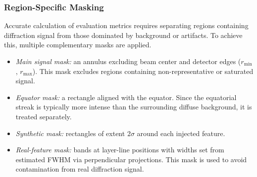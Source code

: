 \documentclass[iucr]{iucrjournals}
\begin{document}
\subsubsection{Region-Specific Masking}

Accurate calculation of evaluation metrics requires separating regions containing diffraction signal from those dominated by background or artifacts. To achieve this, multiple complementary masks are applied.





\begin{itemize}
\item \textit{Main signal mask:} an annulus excluding beam center and detector edges ($r_{\mathrm{min}}$, $r_{\mathrm{max}}$). This mask excludes regions containing non-representative or saturated signal.
\item \textit{Equator mask:} a rectangle aligned with the equator. Since the equatorial streak is typically more intense than the surrounding diffuse background, it is treated separately.
\item \textit{Synthetic mask:} rectangles of extent $2\sigma$ around each injected feature.
\item \textit{Real-feature mask:} bands at layer-line positions with widths set from estimated FWHM via perpendicular projections. This mask is used to avoid contamination from real diffraction signal.
\end{itemize}
\end{document}
